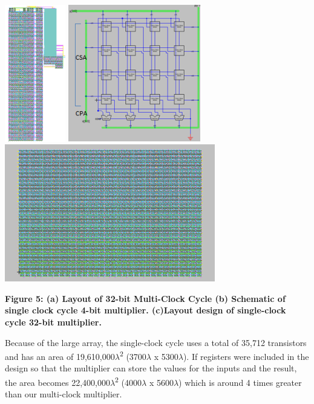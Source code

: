 \documentclass{report}
\begin{document}
 \begin{center}\includegraphics[height=6cm]{MultiClock_lay.png} \includegraphics[height=6cm]{singleclock_schem.png}  \includegraphics[height=6cm]{singleclock_lay.png}\end{center}
  \begin{center}\bf  Figure 5: (a) Layout of 32-bit Multi-Clock Cycle (b) Schematic of single clock cycle 4-bit multiplier. (c)Layout design of single-clock cycle 32-bit multiplier. \end{center}
  Because of the large array, the single-clock cycle uses a total of 35,712 transistors and has an area of 19,610,000$\lambda$\textsuperscript{2} (3700$\lambda$ x 5300$\lambda$). If registers were included in the design so that the multiplier can store the values for the inputs and the result, the area becomes 22,400,000$\lambda$\textsuperscript{2} (4000$\lambda$ x 5600$\lambda$) which is around 4 times greater than our multi-clock multiplier. 
\end{document}
